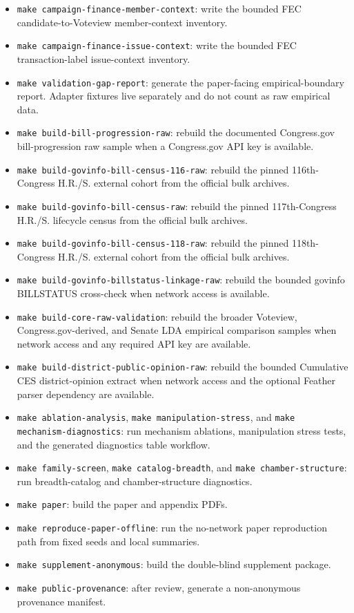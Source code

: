 \documentclass[manuscript]{acmart}
\begin{document}
\begin{itemize}
  \item \texttt{make campaign-finance-member-context}: write the bounded FEC candidate-to-Voteview member-context inventory.
  \item \texttt{make campaign-finance-issue-context}: write the bounded FEC transaction-label issue-context inventory.
  \item \texttt{make validation-gap-report}: generate the paper-facing empirical-boundary report. Adapter fixtures live separately and do not count as raw empirical data.
  \item \texttt{make build-bill-progression-raw}: rebuild the documented Congress.gov bill-progression raw sample when a Congress.gov API key is available.
  \item \texttt{make build-govinfo-bill-census-116-raw}: rebuild the pinned 116th-Congress H.R./S. external cohort from the official bulk archives.
  \item \texttt{make build-govinfo-bill-census-raw}: rebuild the pinned 117th-Congress H.R./S. lifecycle census from the official bulk archives.
  \item \texttt{make build-govinfo-bill-census-118-raw}: rebuild the pinned 118th-Congress H.R./S. external cohort from the official bulk archives.
  \item \texttt{make build-govinfo-billstatus-linkage-raw}: rebuild the bounded govinfo BILLSTATUS cross-check when network access is available.
  \item \texttt{make build-core-raw-validation}: rebuild the broader Voteview, Congress.gov-derived, and Senate LDA empirical comparison samples when network access and any required API key are available.
  \item \texttt{make build-district-public-opinion-raw}: rebuild the bounded Cumulative CES district-opinion extract when network access and the optional Feather parser dependency are available.
  \item \texttt{make ablation-analysis}, \texttt{make manipulation-stress}, and \texttt{make mechanism-diagnostics}: run mechanism ablations, manipulation stress tests, and the generated diagnostics table workflow.
  \item \texttt{make family-screen}, \texttt{make catalog-breadth}, and \texttt{make chamber-structure}: run breadth-catalog and chamber-structure diagnostics.
  \item \texttt{make paper}: build the paper and appendix PDFs.
  \item \texttt{make reproduce-paper-offline}: run the no-network paper reproduction path from fixed seeds and local summaries.
  \item \texttt{make supplement-anonymous}: build the double-blind supplement package.
  \item \texttt{make public-provenance}: after review, generate a non-anonymous provenance manifest.
\end{itemize}
\end{document}
